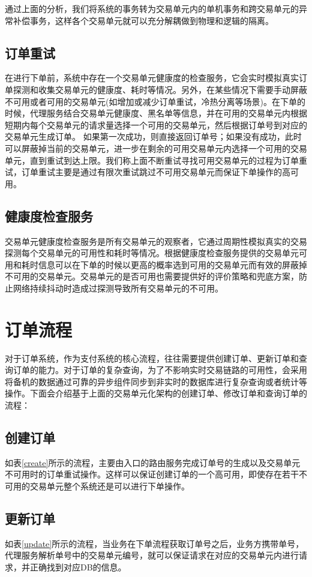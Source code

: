 \documentclass[letterpaper,twocolumn,10pt]{article}
\begin{document}
通过上面的分析，我们将系统的事务转为交易单元内的单机事务和跨交易单元的异常补偿事务，这样各个交易单元就可以充分解耦做到物理和逻辑的隔离。

\subsection{订单重试}
在进行下单前，系统中存在一个交易单元健康度的检查服务，它会实时模拟真实订单探测和收集交易单元的健康度、耗时等情况。另外，在某些情况下需要手动屏蔽不可用或者可用的交易单元(如增加或减少订单重试，冷热分离等场景)。在下单的时候，代理服务结合交易单元健康度、黑名单等信息，并在可用的交易单元内根据短期内每个交易单元的请求量选择一个可用的交易单元，然后根据订单号到对应的交易单元生成订单。
如果第一次成功，则直接返回订单号；如果没有成功，此时可以屏蔽掉当前的交易单元，进一步在剩余的可用交易单元内选择一个可用的交易单元，直到重试到达上限。我们称上面不断重试寻找可用交易单元的过程为订单重试，订单重试主要是通过有限次重试跳过不可用交易单元而保证下单操作的高可用。


\subsection{健康度检查服务}
交易单元健康度检查服务是所有交易单元的观察者，它通过周期性模拟真实的交易探测每个交易单元的可用性和耗时等情况。根据健康度检查服务提供的交易单元可用和耗时信息可以在下单的时候以更高的概率选到可用的交易单元而有效的屏蔽掉不可用的交易单元。交易单元的是否可用也需要提供好的评价策略和兜底方案，防止网络持续抖动时造成过探测导致所有交易单元的不可用。

\section{订单流程}
对于订单系统，作为支付系统的核心流程，往往需要提供创建订单、更新订单和查询订单的能力。对于订单的复杂查询，为了不影响实时交易链路的可用性，会采用将备机的数据通过可靠的异步组件同步到非实时的数据库进行复杂查询或者统计等操作。下面会介绍基于上面的交易单元化架构的创建订单、修改订单和查询订单的流程：

\subsection{创建订单}
如表\ref{create}所示的流程，主要由入口的路由服务完成订单号的生成以及交易单元不可用时的订单重试操作。这样可以保证创建订单的一个高可用，即使存在若干不可用的交易单元整个系统还是可以进行下单操作。

\subsection{更新订单}
如表\ref{update}所示的流程，当业务在下单流程获取订单号之后，业务方携带单号，代理服务解析单号中的交易单元编号，就可以保证请求在对应的交易单元内进行请求，并正确找到对应DB的信息。
\end{document}
